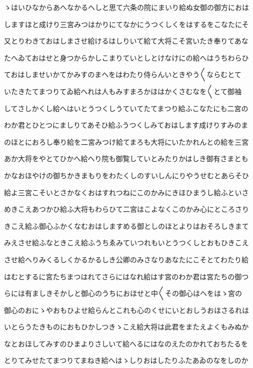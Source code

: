 \documentclass[a4paper,11pt,landscape]{ltjtarticle}
\begin{document}
ゝはいひなからあへなかるへしと思て六条の院にまいり給ぬ女御の御方におは
\par\medskip
しますほと成けり三宮みつはかりにてなかにうつくしくをはするをこなたにそ
\par\medskip
又とりわきておはしまさせ給けるはしりいて給て大将こそ宮いたき奉りてあな
\par\medskip
たへゐておはせと身つからかしこまりていとしとけなけにの給へはうちわらひ
\par\medskip
ておはしませいかてかみすのまへをはわたり侍らんいときやう〱ならむとて
\par\medskip
いたきたてまつりてゐ給へれは人もみすまろかほはかくさむなを〱とて御袖
\par\medskip
してさしかくし給へはいとうつくしうていてたてまつり給ふこなたにも二宮の
\par\medskip
わか君とひとつにましりてあそひ給ふうつくしみておはします成けりすみのま
\par\medskip
のほとにおろし奉り給を二宮みつけ給てまろも大将にいたかれんとの給を三宮
\par\medskip
あか大将をやとてひかへ給へり院も御覧していとみたりかはしき御有さまとも
\par\medskip
かなおほやけの御ちかきまもりをわたくしのすいしんにりやうせむとあらそひ
\par\medskip
給よ三宮こそいとさかなくおはすれつねにこのかみにきほひまうし給ふといさ
\par\medskip
めきこえあつかひ給ふ大将もわらひて二宮はこよなくこのかみ心にところさり
\par\medskip
きこえ給ふ御心ふかくなむおはしますめる御としのほとよりはおそろしきまて
\par\medskip
みえさせ給ふなときこえ給ふうちゑみていつれもいとうつくしとおもひきこえ
\par\medskip
させ給へりみくるしくかるかるしき公卿のみさなりあなたにこそとてわたり給
\par\medskip
はむとするに宮たちまつはれてさらにはなれ給はす宮のわか君は宮たちの御つ
\par\medskip
らには有ましきそかしと御心のうちにおほせと中〱その御心はへをはゝ宮の
\par\medskip
御心のおにゝやおもひよせ給らんとこれも心のくせにいとおしうおほさるれは
\par\medskip
いとらうたきものにおもひかしつきゝこえ給大将は此君をまたえよくもみぬか
\par\medskip
なとおほしてみすのひまよりさしいて給へるにはなのえたのかれておちたるを
\par\medskip
とりてみせたてまつりてまねき給へはゝしりおはしたりふたあゐのなをしのか
\end{document}
